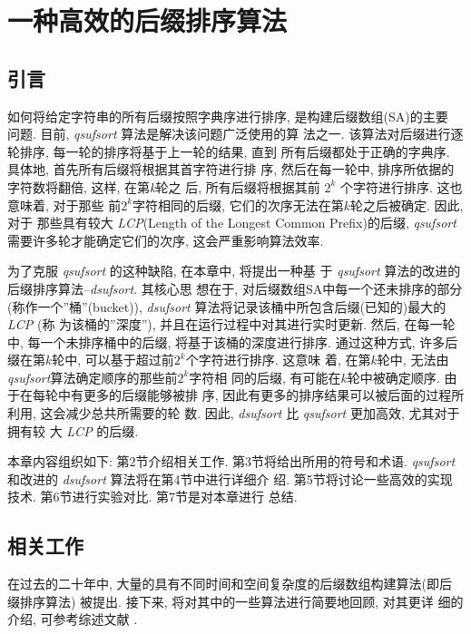 \documentclass{ws-ijprai}
\begin{document}

\chapter{一种高效的后缀排序算法}
\section{引言}
\label{sec:introduction}

如何将给定字符串的所有后缀按照字典序进行排序, 是构建后缀数组(SA)的主要
问题. 目前, \emph{qsufsort}\cite{Larsson2007} 算法是解决该问题广泛使用的算
法之一. 该算法对后缀进行逐轮排序, 每一轮的排序将基于上一轮的结果, 直到
所有后缀都处于正确的字典序. 具体地, 首先所有后缀将根据其首字符进行排
序, 然后在每一轮中, 排序所依据的字符数将翻倍, 这样, 在第\emph{k}轮之
后, 所有后缀将根据其前 $2^{k}$ 个字符进行排序. 这也意味着, 对于那些
前$2^{k}$字符相同的后缀, 它们的次序无法在第$k$轮之后被确定. 因此, 对于
那些具有较大 \emph{LCP}(Length of the Longest Common Prefix)的后缀,
\emph{qsufsort} 需要许多轮才能确定它们的次序, 这会严重影响算法效率.

为了克服 \emph{qsufsort} 的这种缺陷, 在本章中, 将提出一种基
于 \emph{qsufsort} 算法的改进的后缀排序算法--\emph{dsufsort}. 其核心思
想在于, 对后缀数组SA中每一个还未排序的部分(称作一个''桶''(bucket)),
\emph{dsufsort} 算法将记录该桶中所包含后缀(已知的)最大的\emph{LCP} (称
为该桶的''深度''), 并且在运行过程中对其进行实时更新. 然后, 在每一轮中,
每一个未排序桶中的后缀, 将基于该桶的深度进行排序. 通过这种方式, 许多后
缀在第$k$轮中, 可以基于超过前$2^k$个字符进行排序. 这意味
着, 在第$k$轮中, 无法由\emph{qsufsort}算法确定顺序的那些前$2^{k}$字符相
同的后缀, 有可能在$k$轮中被确定顺序. 由于在每轮中有更多的后缀能够被排
序, 因此有更多的排序结果可以被后面的过程所利用, 这会减少总共所需要的轮
数. 因此, \emph{dsufsort} 比 \emph{qsufsort} 更加高效, 尤其对于拥有较
大 \emph{LCP} 的后缀.

本章内容组织如下: 第2节介绍相关工作. 第3节将给出所用的符号和术语.
\emph{qsufsort} 和改进的 \emph{dsufsort} 算法将在第4节中进行详细介
绍. 第5节将讨论一些高效的实现技术. 第6节进行实验对比. 第7节是对本章进行
总结.

\section{相关工作}

在过去的二十年中, 大量的具有不同时间和空间复杂度的后缀数组构建算法(即后
缀排序算法) 被提出. 接下来, 将对其中的一些算法进行简要地回顾, 对其更详
细的介绍, 可参考综述文献 \cite{Puglisi2007} \cite{Dhaliwal2012}.
\end{document}
